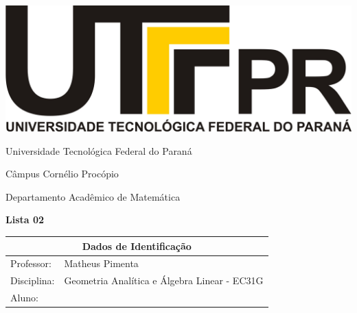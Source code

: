 \documentclass[oneside,a4paper,12pt]{article}
\newcommand{\universidade}{Universidade Tecnológica Federal do Paraná}
\newcommand{\centro}{Câmpus Cornélio Procópio}
\newcommand{\departamento}{Departamento Acadêmico de Matemática}
\newcommand{\curso}{Engenharia da Computação}
\newcommand{\professores}{Matheus Pimenta}
\newcommand{\disciplina}{Geometria Analítica e Álgebra Linear - EC31G}
\begin{document}
	\pagestyle{empty}
	
	\begin{center}
		\includegraphics[width=\linewidth/8]{logo.jpg}%
	 	\vspace{2pt} 	
		
		\universidade
		\par
		\centro
		\par
		\departamento
		\par
		\par
		\vspace{12pt}
		\LARGE \textbf{Lista 02}
		
	\end{center}
	
	\vspace{12pt}
	
	\begin{tabular}{ |l|p{12cm}| }
		
		\hline
		\multicolumn{2}{|c|}{\textbf{Dados de Identificação}} \\
		\hline
		Professor:         &    \professores           \\
		\hline
		Disciplina:        &    \disciplina          \\
		\hline
		Aluno:             &                   \\
		\hline
		
	\end{tabular}
	\vspace{6pt}
	
	
	\begin{snugshade}
	\end{snugshade}
\end{document}

